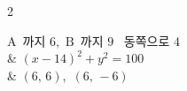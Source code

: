 \documentclass[10pt,fleqn]{article}
\begin{document}
\begin{multicols*}{2}
%
\begin{dmanslist}
 $\mathrm{A}$\ 까지 $6$,\ $\mathrm{B}$\ 까지 $9$ \textperiodcentered\ 동쪽으로 $4$\\
&  $(x-14)^{2}+y^{2}=100$\\
&  $(6,\,6)$,\ $(6,\,-6)$
\end{dmanslist}


\end{multicols*}
\end{document}
